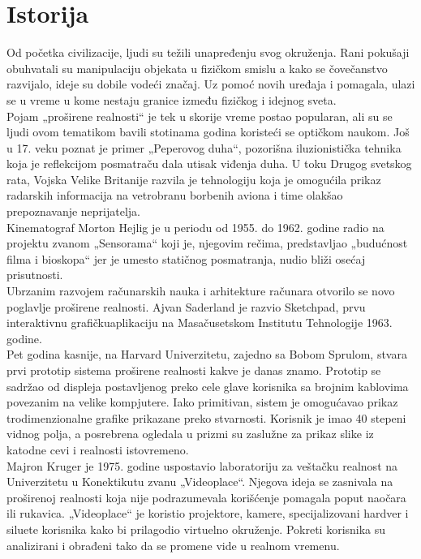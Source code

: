 \documentclass[a4paper]{article}
\begin{document}
	\section{Istorija}
    \label{sec:Istorija}
    Od početka civilizacije, ljudi su težili unapređenju svog okruženja. Rani pokušaji obuhvatali su manipulaciju objekata u fizičkom smislu a kako se čovečanstvo razvijalo, ideje su dobile vodeći značaj. Uz pomoć novih uređaja i pomagala, ulazi se u vreme u kome nestaju granice između fizičkog i idejnog sveta.\\
    Pojam „proširene realnosti“ je tek u skorije vreme postao popularan, ali su se ljudi ovom tematikom bavili stotinama godina koristeći se optičkom naukom. Još u 17. veku poznat je primer „Peperovog duha“, pozorišna iluzionistička tehnika koja je reflekcijom posmatraču dala utisak viđenja duha. U toku Drugog svetskog rata, Vojska Velike Britanije razvila je tehnologiju koja je omogućila prikaz radarskih informacija na vetrobranu borbenih aviona i time olakšao prepoznavanje neprijatelja.\\
    Kinematograf Morton Hejlig je u periodu od 1955. do 1962. godine radio na projektu zvanom „Sensorama“ koji je, njegovim rečima, predstavljao „budućnost filma i bioskopa“ jer je umesto statičnog posmatranja, nudio bliži osećaj prisutnosti.\\
    Ubrzanim razvojem računarskih nauka i arhitekture računara otvorilo se novo poglavlje proširene realnosti. Ajvan Saderland je razvio Sketchpad, prvu interaktivnu grafičkuaplikaciju na Masačusetskom Institutu Tehnologije 1963. godine.\\
    Pet godina kasnije, na Harvard Univerzitetu, zajedno sa Bobom Sprulom, stvara prvi prototip sistema proširene realnosti kakve je danas znamo. Prototip se sadržao od displeja postavljenog preko cele glave korisnika sa brojnim kablovima povezanim na velike kompjutere. Iako primitivan, sistem je omogućavao prikaz trodimenzionalne grafike prikazane preko stvarnosti. Korisnik je imao 40 stepeni vidnog polja, a posrebrena ogledala u prizmi su zaslužne za prikaz slike iz katodne cevi i realnosti istovremeno.\\
    Majron Kruger je 1975. godine uspostavio laboratoriju za veštačku realnost na Univerzitetu u Konektikutu zvanu „Videoplace“. Njegova ideja se zasnivala na proširenoj realnosti koja nije podrazumevala korišćenje pomagala poput naočara ili rukavica. „Videoplace“ je koristio projektore, kamere, specijalizovani hardver i siluete korisnika kako bi prilagodio virtuelno okruženje. Pokreti korisnika su analizirani i obrađeni tako da se promene vide u realnom vremenu.\\
\end{document}
